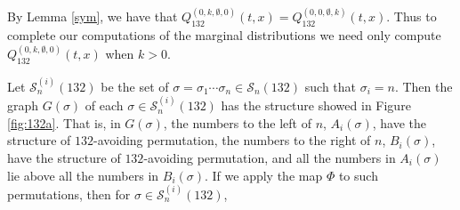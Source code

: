 \documentclass[
final,nomarks
]{dmtcs-episciences}
\newcommand{\fref}[1]{Figure \ref{fig:#1}}
\newcommand{\Sn}[1]{\mathcal{S}_{#1}}
\newcommand{\Qmm}[1]{Q_{132}^{(#1)}(t,x)}
\begin{document}
By Lemma \ref{sym}, we have that \begin{math}\Qmm{0,k,\emptyset,0} = \Qmm{0,0,\emptyset,k}\end{math}. 
Thus to complete our computations of the marginal distributions we need 
only compute \begin{math}\Qmm{0,k,\emptyset,0}\end{math} when \begin{math}k >  0\end{math}. 


Let \begin{math}\Sn{n}^{(i)}(132)\end{math} be the set of \begin{math}\sigma=\sigma_1\cdots\sigma_n\in\Sn{n}(132)\end{math} such that \begin{math}\sigma_i=n\end{math}. Then the graph \begin{math}G(\sigma)\end{math} of each \begin{math}\sigma\in\Sn{n}^{(i)}(132)\end{math} has the structure showed in \fref{132a}. That is, in \begin{math}G(\sigma)\end{math}, the numbers to the left of \begin{math}n\end{math}, \begin{math}A_i(\sigma)\end{math}, have the structure of \begin{math}132\end{math}-avoiding permutation, the numbers to the right of \begin{math}n\end{math}, \begin{math}B_i(\sigma)\end{math}, have the structure of \begin{math}132\end{math}-avoiding permutation, and all the numbers in \begin{math}A_i(\sigma)\end{math} lie above all the numbers in \begin{math}B_i(\sigma)\end{math}. If we 
apply the map \begin{math}\Phi\end{math} to such permutations, then for \begin{math}\sigma\in\Sn{n}^{(i)}(132)\end{math}, 
\end{document}
